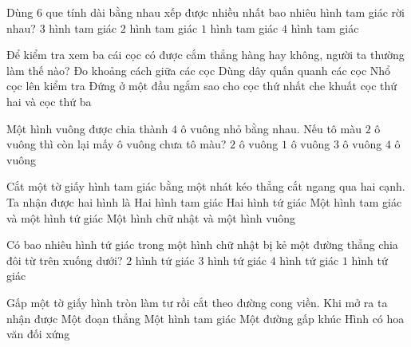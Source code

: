 \begin{ex} %
Dùng $6$ que tính dài bằng nhau xếp được nhiều nhất bao nhiêu hình tam giác rời nhau?
\choice
{$3$ hình tam giác}
{\True $2$ hình tam giác}
{$1$ hình tam giác}
{$4$ hình tam giác}
\end{ex}

\begin{ex} %
Để kiểm tra xem ba cái cọc có được cắm thẳng hàng hay không, người ta thường làm thế nào?
\choice
{Đo khoảng cách giữa các cọc}
{Dùng dây quấn quanh các cọc}
{Nhổ cọc lên kiểm tra}
{\True Đứng ở một đầu ngắm sao cho cọc thứ nhất che khuất cọc thứ hai và cọc thứ ba}
\end{ex}

\begin{ex} %
Một hình vuông được chia thành $4$ ô vuông nhỏ bằng nhau. Nếu tô màu $2$ ô vuông thì còn lại mấy ô vuông chưa tô màu?
\choice
{\True $2$ ô vuông}
{$1$ ô vuông}
{$3$ ô vuông}
{$4$ ô vuông}
\end{ex}

\begin{ex} %
Cắt một tờ giấy hình tam giác bằng một nhát kéo thẳng cắt ngang qua hai cạnh. Ta nhận được hai hình là
\choice
{Hai hình tam giác}
{Hai hình tứ giác}
{\True Một hình tam giác và một hình tứ giác}
{Một hình chữ nhật và một hình vuông}
\end{ex}

\begin{ex} %
Có bao nhiêu hình tứ giác trong một hình chữ nhật bị kẻ một đường thẳng chia đôi từ trên xuống dưới?
\choice
{$2$ hình tứ giác}
{\True $3$ hình tứ giác}
{$4$ hình tứ giác}
{$1$ hình tứ giác}
\end{ex}

\begin{ex} %
Gấp một tờ giấy hình tròn làm tư rồi cắt theo đường cong viền. Khi mở ra ta nhận được
\choice
{Một đoạn thẳng}
{Một hình tam giác}
{Một đường gấp khúc}
{\True Hình có hoa văn đối xứng}
\end{ex}

